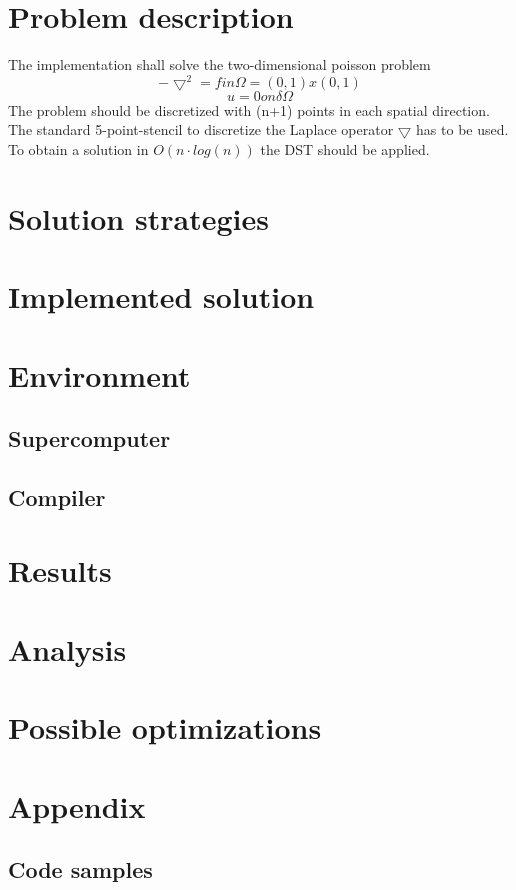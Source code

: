 \documentclass{article}
\begin{document}
\section{Problem description}
The implementation shall solve the two-dimensional poisson problem 
\begin{equation}
-\bigtriangledown^2=f in \Omega = (0,1)x(0,1)
\end{equation}
\begin{equation}
u = 0 on \delta\Omega
\end{equation}
The problem should be discretized with (n+1) points in each spatial direction. The standard 5-point-stencil to discretize the Laplace operator $\bigtriangledown$ has to be used. To obtain a solution in $O(n\cdot log(n))$ the DST should be applied.
\section{Solution strategies}

\section{Implemented solution}

\section{Environment}
\subsection{Supercomputer}

\subsection{Compiler}

\section{Results}

\section{Analysis}

\section{Possible optimizations}

\section{Appendix}
\subsection{Code samples}
\end{document}
